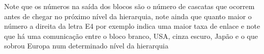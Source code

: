 Note que os números na saída dos blocos são o número de cascatas que ocorrem antes de chegar no próximo nível da hierarquia, note ainda que quanto maior o número a
direita da letra E4 por exemplo indica uma maior taxa de enlace e note que há uma comunicação entre o bloco branco, USA, cinza escuro, Japão e o que sobrou Europa num
determinado nível da hierarquia
